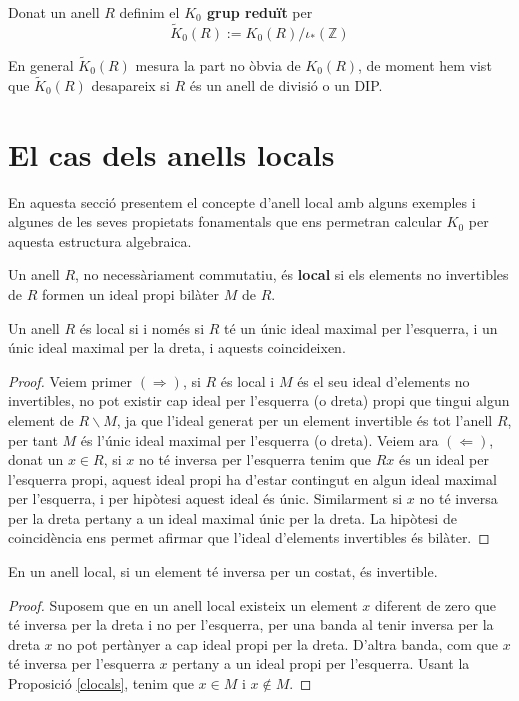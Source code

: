 \begin{definition}
Donat un anell $R$ definim el \textbf{$K_0$ grup reduït} per
$$
\tilde{K}_0(R):=K_0(R)/\iota_*(\mathbb{Z})
$$
\end{definition}
En general $\tilde{K}_0(R)$ mesura la part no òbvia de $K_0(R)$, de moment hem vist que $\tilde{K}_0(R)$ desapareix si $R$ és un anell de divisió o un DIP.

\section{El cas dels anells locals}
En aquesta secció presentem el concepte d'anell local amb alguns exemples i algunes de les seves propietats fonamentals que ens permetran calcular $K_0$ per aquesta estructura algebraica.  \\

\begin{definition} 
Un anell $R$, no necessàriament commutatiu, és \textbf{local} si els elements no invertibles de $R$ formen un ideal propi bilàter $M$ de $R$.
\end{definition}

\begin{prop} \label{clocals}
Un anell $R$ és local si i només si $R$ té un únic ideal maximal per l'esquerra, i un únic ideal maximal per la dreta, i aquests coincideixen.
\end{prop}
\begin{proof}
Veiem primer $(\Rightarrow)$, si $R$ és local i $M$ és el seu ideal d'elements no invertibles, no pot existir cap ideal per l'esquerra (o dreta) propi que tingui algun element de $R\backslash M$, ja que l'ideal generat per un element invertible és tot l'anell $R$, per tant $M$ és l'únic ideal maximal per l'esquerra (o dreta). Veiem ara $(\Leftarrow)$, donat un $x\in R$, si $x$ no té inversa per l'esquerra tenim que $Rx$ és un ideal per l'esquerra propi, aquest ideal propi ha d'estar contingut en algun ideal maximal per l'esquerra, i per hipòtesi aquest ideal és únic. Similarment si $x$ no té inversa per la dreta pertany a un ideal maximal únic per la dreta. La hipòtesi de coincidència ens permet afirmar que l'ideal d'elements invertibles és bilàter.
\end{proof}

\begin{corollary}
En un anell local, si un element té inversa per un costat, és invertible.
\end{corollary}
\begin{proof}
Suposem que en un anell local existeix un element $x$ diferent de zero que té inversa per la dreta i no per l'esquerra, per una banda al tenir inversa per la dreta $x$ no pot pertànyer a cap ideal propi per la dreta. D'altra banda, com que $x$ té inversa per l'esquerra $x$ pertany a un ideal propi per l'esquerra. Usant la Proposició \ref{clocals}, tenim que $x\in M$ i $x\not \in M$.
\end{proof}


